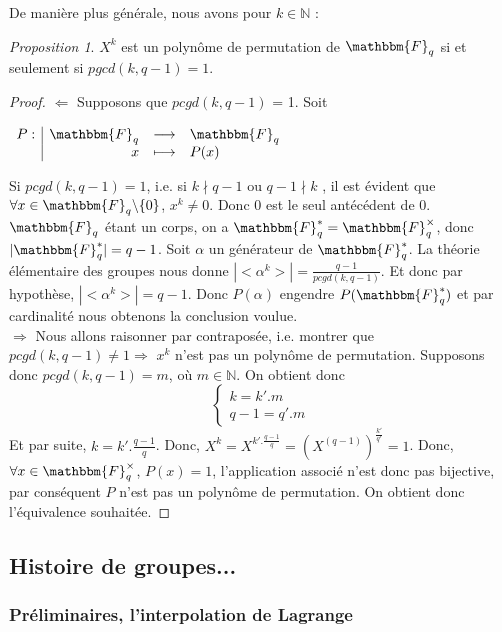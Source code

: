\documentclass[12pt]{article}
\theoremstyle{remark}\newtheorem{note}{Note}
\theoremstyle{remark}\newtheorem{nota}{Notation}
\newcommand{\F}{\mathbbm{F}}
\newcommand{\Fq}{\mathbbm{F}_q}
\newtheorem{prop}{Proposition}
\theoremstyle{definition}
\begin{document}
De manière plus générale, nous avons pour $k \in \mathds{N}$ :

\begin{prop}
$X^k$ est un polynôme de permutation de $\Fq$ si et seulement si $pgcd(k, q-1) = 1$.
\end{prop}

\begin{proof}
$\Leftarrow$ Supposons que $pcgd(k,q-1)$ = 1.
Soit
\begin{center}
$
\begin{array}{l|rcl}
\displaystyle
P : & \F _q & \longrightarrow & \F _q \\
    & x & \longmapsto & P(x)
\end{array}
$
\end{center}
Si $pcgd(k,q-1)=1$, i.e. si $k \nmid q-1$ ou $q-1 \nmid k$ , il est évident que $\forall x \in \Fq \backslash\{0\}$, $x^k \neq 0$. Donc $0$ est le seul antécédent de $0$.
$\Fq$ étant un corps, on a $\Fq^* = \Fq^{\times}$, donc $|\Fq^*| = q-1$. Soit $\alpha$ un générateur de $\Fq^*$. La théorie élémentaire des groupes nous donne $|<\alpha^k>| = \frac{q-1}{pcgd(k,q-1)}$. Et donc par hypothèse, $|<\alpha^k>| =  q-1$.  Donc $P(\alpha)$ engendre $P(\Fq^*)$ et par cardinalité nous obtenons la conclusion voulue.\newline \\
$\Rightarrow$ Nous allons raisonner par contraposée, i.e. montrer que $pcgd(k,q-1) \ne 1 \Rightarrow$ $x^k$ n'est pas un polynôme de permutation.\newline
Supposons donc $pcgd(k,q-1) = m$, où $m \in \mathds{N}$. On obtient donc 
$$
\left\{
    \begin{array}{ll}
        k = k'.m \\
        q-1 = q'.m
    \end{array}
\right.
$$
Et par suite, $k  =k'.\frac{q-1}{q}$.\newline
Donc, $X^k = X^{k'.\frac{q-1}{q}} = (X^{(q-1)})^{\frac{k'}{q'}} = 1$. Donc, $\forall x \in \Fq^{\times}$, $P(x) = 1$, l'application associé n'est donc pas bijective, par conséquent $P$ n'est pas un polynôme de permutation. \newline
On obtient donc l'équivalence souhaitée.
\end{proof}

\subsection{Histoire de groupes...}
\subsubsection{Préliminaires, l'interpolation de Lagrange}
\end{document}
